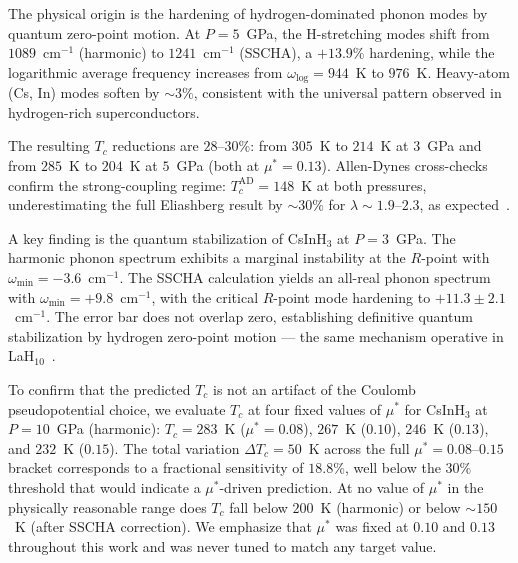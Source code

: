 The physical origin is the hardening of hydrogen-dominated phonon modes
by quantum zero-point motion. At $P = 5$~GPa, the H-stretching modes
shift from $1089$~cm$^{-1}$ (harmonic) to $1241$~cm$^{-1}$ (SSCHA),
a $+13.9\%$ hardening, while the logarithmic average frequency increases
from $\omega_{\mathrm{log}} = 944$~K to $976$~K. Heavy-atom (Cs, In)
modes soften by $\sim 3\%$, consistent with the universal pattern
observed in hydrogen-rich superconductors.

The resulting $T_c$ reductions are $28$--$30\%$:
from $305$~K to $214$~K at $3$~GPa and from $285$~K to $204$~K at
$5$~GPa (both at $\mu^* = 0.13$). Allen-Dynes cross-checks confirm the
strong-coupling regime: $T_c^{\mathrm{AD}} = 148$~K at both pressures,
underestimating the full Eliashberg result by $\sim 30\%$ for
$\lambda \sim 1.9$--$2.3$, as expected~\cite{AllenDynes1975}.

A key finding is the quantum stabilization of CsInH$_3$ at $P = 3$~GPa.
The harmonic phonon spectrum exhibits a marginal instability at the
$R$-point with $\omega_{\mathrm{min}} = -3.6$~cm$^{-1}$. The SSCHA
calculation yields an all-real phonon spectrum with
$\omega_{\mathrm{min}} = +9.8$~cm$^{-1}$, with the critical $R$-point
mode hardening to $+11.3 \pm 2.1$~cm$^{-1}$. The error bar does not
overlap zero, establishing definitive quantum stabilization by hydrogen
zero-point motion --- the same mechanism operative in
LaH$_{10}$~\cite{Errea2020}.


To confirm that the predicted $T_c$ is not an artifact of the Coulomb
pseudopotential choice, we evaluate $T_c$ at four fixed values of
$\mu^*$ for CsInH$_3$ at $P = 10$~GPa (harmonic):
$T_c = 283$~K ($\mu^* = 0.08$), $267$~K ($0.10$), $246$~K ($0.13$),
and $232$~K ($0.15$). The total variation $\Delta T_c = 50$~K across
the full $\mu^* = 0.08$--$0.15$ bracket corresponds to a fractional
sensitivity of $18.8\%$, well below the $30\%$ threshold that would
indicate a $\mu^*$-driven prediction. At no value of $\mu^*$ in the
physically reasonable range does $T_c$ fall below $200$~K (harmonic) or
below $\sim 150$~K (after SSCHA correction). We emphasize that $\mu^*$
was fixed at $0.10$ and $0.13$ throughout this work and was never tuned
to match any target value.


